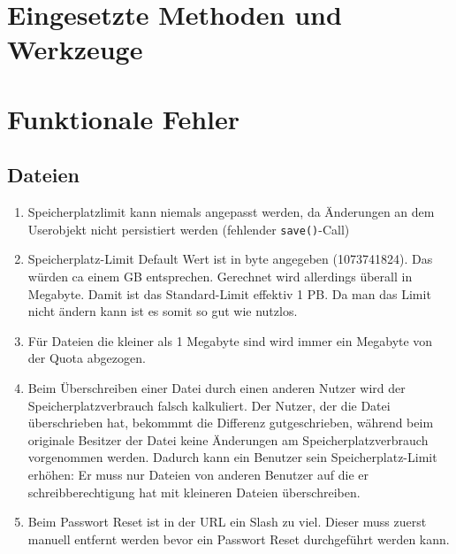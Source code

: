 \documentclass[12pt,DIV14,BCOR10mm,a4paper,parskip=half-,headsepline,headinclude,english,ngerman,bibliography=totocnumbered]{scrreprt}
\begin{document}
\chapter{Eingesetzte Methoden und Werkzeuge}


\chapter{Funktionale Fehler}


\section{Dateien}

\begin{enumerate}
 \item Speicherplatzlimit kann niemals angepasst werden, da Änderungen an dem Userobjekt nicht persistiert werden (fehlender \texttt{save()}-Call)
  \item Speicherplatz-Limit Default Wert ist in byte angegeben (1073741824). Das würden ca einem GB entsprechen. Gerechnet wird allerdings überall in Megabyte. Damit ist das Standard-Limit effektiv 1 PB. Da man das Limit nicht ändern kann ist es somit so gut wie nutzlos.
  \item Für Dateien die kleiner als 1 Megabyte sind wird immer ein Megabyte von der Quota abgezogen.
  \item Beim Überschreiben einer Datei durch einen anderen Nutzer wird der Speicherplatzverbrauch falsch kalkuliert. Der Nutzer, der die Datei überschrieben hat, bekommmt die Differenz gutgeschrieben, während beim originale Besitzer der Datei keine Änderungen am Speicherplatzverbrauch vorgenommen werden. Dadurch kann ein Benutzer sein Speicherplatz-Limit erhöhen: Er muss nur Dateien von anderen Benutzer auf die er schreibberechtigung hat mit kleineren Dateien überschreiben.
  \item Beim Passwort Reset ist in der URL ein Slash zu viel. Dieser muss zuerst manuell entfernt werden bevor ein Passwort Reset durchgeführt werden kann.
  

\end{enumerate}
\end{document}
